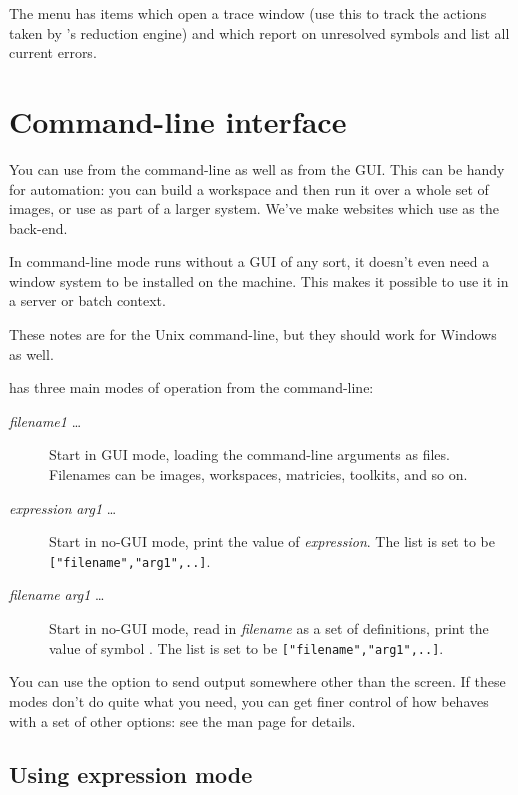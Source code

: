 The  menu has items which open a trace window (use this to track
the actions taken by \nip{}'s reduction engine) and which report on unresolved
symbols and list all current errors.

\section{Command-line interface}

You can use \nip{} from the command-line as well as from the GUI. This can be
handy for automation: you can build a workspace and then run it over a whole set
of images, or use \nip{} as part of a larger system. We've make
websites which use \nip{} as the back-end.

In command-line mode \nip{} runs without a GUI of any sort, it doesn't
even need a window system to be installed on the machine. This makes it
possible to use it in a server or batch context.

These notes are for the Unix command-line, but they should work for Windows as
well.

\nip{} has three main modes of operation from the command-line:

\begin{description}

\item[\nip{} \emph{filename1} \ldots{}]
Start \nip{} in GUI mode, loading the command-line arguments as files.
Filenames can be images, workspaces, matricies, toolkits, and so on.

\item[\nip{}  \emph{expression} \emph{arg1} \ldots{}]
Start in no-GUI mode, print the value of \emph{expression}. The list
 is set to be \verb+["filename","arg1",..]+.

\item[\nip{}  \emph{filename} \emph{arg1} \ldots{}] Start
in no-GUI mode, read in \emph{filename} as a set of definitions,
print the value of symbol .  The list  is set to be
\verb+["filename","arg1",..]+.

\end{description}

You can use the  option to send output somewhere other than the
screen. If these modes don't do quite what you need, you can get finer control
of how \nip{} behaves with a set of other options: see the man page for
details.

\subsection{Using expression mode}

